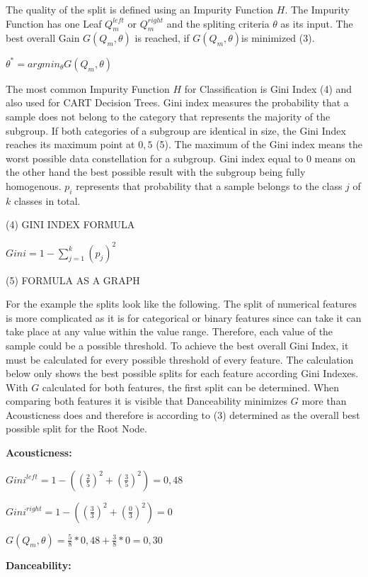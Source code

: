 The quality of the split is defined using an Impurity Function \(H\). The Impurity Function has one 
Leaf \(Q^{left}_{m}\) or \(Q^{right}_{m}\) and the spliting criteria \(\theta \) as its input. The 
best overall Gain \(G(Q_{m},\theta)\) is reached, if \(G(Q_{m},\theta)\)is minimized (3). 

\(\theta ^* = argmin_{\theta}  G(Q_{m}, \theta)\)

The most common Impurity Function \(H\) for Classification is Gini Index (4) and also used for CART
Decision Trees. Gini index measures the probability that a sample does not belong to the category
that represents the majority of the subgroup. If both categories of a subgroup are identical in 
size, the Gini Index reaches its maximum point at \(0,5\) (5). The maximum of the Gini index means 
the worst possible data constellation for a subgroup. Gini index equal to \(0\) means on the other 
hand the best possible result with the subgroup being fully homogenous. \(p_{i}\) represents that 
probability that a sample belongs to the class \(j\) of \(k\) classes  in total.

(4) GINI INDEX FORMULA 

\(Gini = 1 - \sum ^k_{j = 1}(p_{j})^2\)

(5) FORMULA AS A GRAPH

For the example the splits look like the following. The split of numerical features is more 
complicated as it is for categorical or binary features since can take it can take place at 
any value within the value range. Therefore, each value of the sample could be a possible 
threshold. To achieve the best overall Gini Index, it must be calculated for every possible 
threshold of every feature. The calculation below only shows the best possible splits for 
each feature according Gini Indexes. With \(G\) calculated for both features, the first split 
can be determined. When comparing both features it is visible that Danceability minimizes \(G\)
more than Acousticness does and therefore is according to (3) determined as the overall best possible split for 
the Root Node. 

\textbf{Acousticness:}

\(Gini^{left} = 1 - ((\frac{2}{5})^2 + (\frac{3}{5})^2) = 0,48 \)

\(Gini^{right}  = 1 - ((\frac{3}{3})^2 + (\frac{0}{3})^2) = 0 \)

\(G(Q_{m},\theta) = \frac{5}{8} * 0,48 + \frac{3}{8} * 0 = 0,30 \)

\textbf{Danceability:}

